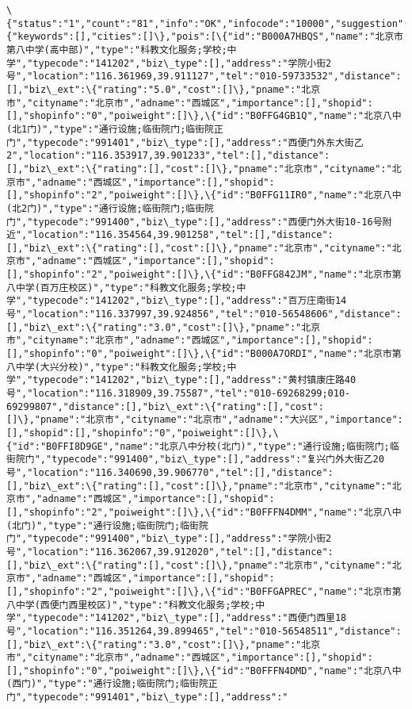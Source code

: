 \documentclass[11pt]{article}
\begin{document}
    \begin{Verbatim}[commandchars=\\\{\}]
\{"status":"1","count":"81","info":"OK","infocode":"10000","suggestion":\{"keywords":[],"cities":[]\},"pois":[\{"id":"B000A7HBQS","name":"北京市第八中学(高中部)","type":"科教文化服务;学校;中学","typecode":"141202","biz\_type":[],"address":"学院小街2号","location":"116.361969,39.911127","tel":"010-59733532","distance":[],"biz\_ext":\{"rating":"5.0","cost":[]\},"pname":"北京市","cityname":"北京市","adname":"西城区","importance":[],"shopid":[],"shopinfo":"0","poiweight":[]\},\{"id":"B0FFG4GB1Q","name":"北京八中(北1门)","type":"通行设施;临街院门;临街院正门","typecode":"991401","biz\_type":[],"address":"西便门外东大街乙2","location":"116.353917,39.901233","tel":[],"distance":[],"biz\_ext":\{"rating":[],"cost":[]\},"pname":"北京市","cityname":"北京市","adname":"西城区","importance":[],"shopid":[],"shopinfo":"2","poiweight":[]\},\{"id":"B0FFG11IR0","name":"北京八中(北2门)","type":"通行设施;临街院门;临街院门","typecode":"991400","biz\_type":[],"address":"西便门外大街10-16号附近","location":"116.354564,39.901258","tel":[],"distance":[],"biz\_ext":\{"rating":[],"cost":[]\},"pname":"北京市","cityname":"北京市","adname":"西城区","importance":[],"shopid":[],"shopinfo":"2","poiweight":[]\},\{"id":"B0FFG842JM","name":"北京市第八中学(百万庄校区)","type":"科教文化服务;学校;中学","typecode":"141202","biz\_type":[],"address":"百万庄南街14号","location":"116.337997,39.924856","tel":"010-56548606","distance":[],"biz\_ext":\{"rating":"3.0","cost":[]\},"pname":"北京市","cityname":"北京市","adname":"西城区","importance":[],"shopid":[],"shopinfo":"0","poiweight":[]\},\{"id":"B000A7ORDI","name":"北京市第八中学(大兴分校)","type":"科教文化服务;学校;中学","typecode":"141202","biz\_type":[],"address":"黄村镇康庄路40号","location":"116.318909,39.75587","tel":"010-69268299;010-69299807","distance":[],"biz\_ext":\{"rating":[],"cost":[]\},"pname":"北京市","cityname":"北京市","adname":"大兴区","importance":[],"shopid":[],"shopinfo":"0","poiweight":[]\},\{"id":"B0FFI8D9GE","name":"北京八中分校(北门)","type":"通行设施;临街院门;临街院门","typecode":"991400","biz\_type":[],"address":"复兴门外大街乙20号","location":"116.340690,39.906770","tel":[],"distance":[],"biz\_ext":\{"rating":[],"cost":[]\},"pname":"北京市","cityname":"北京市","adname":"西城区","importance":[],"shopid":[],"shopinfo":"2","poiweight":[]\},\{"id":"B0FFFN4DMM","name":"北京八中(北门)","type":"通行设施;临街院门;临街院门","typecode":"991400","biz\_type":[],"address":"学院小街2号","location":"116.362067,39.912020","tel":[],"distance":[],"biz\_ext":\{"rating":[],"cost":[]\},"pname":"北京市","cityname":"北京市","adname":"西城区","importance":[],"shopid":[],"shopinfo":"2","poiweight":[]\},\{"id":"B0FFGAPREC","name":"北京市第八中学(西便门西里校区)","type":"科教文化服务;学校;中学","typecode":"141202","biz\_type":[],"address":"西便门西里18号","location":"116.351264,39.899465","tel":"010-56548511","distance":[],"biz\_ext":\{"rating":"3.0","cost":[]\},"pname":"北京市","cityname":"北京市","adname":"西城区","importance":[],"shopid":[],"shopinfo":"0","poiweight":[]\},\{"id":"B0FFFN4DMD","name":"北京八中(西门)","type":"通行设施;临街院门;临街院正门","typecode":"991401","biz\_type":[],"address":"
\end{Verbatim}
\end{document}
